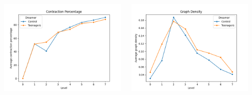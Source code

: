 \begin{minipage}[t]{\textwidth}
    \begin{columns}
    \begin{column}{0.45\textwidth}
        \includegraphics[width=\textwidth]{immagini/Contraction_percentage_teens}
    \end{column}
    \begin{column}{0.45\textwidth}
        \includegraphics[width=\textwidth]{immagini/Graph_density_teens}
    \end{column}
        \end{columns}
    \end{minipage}
